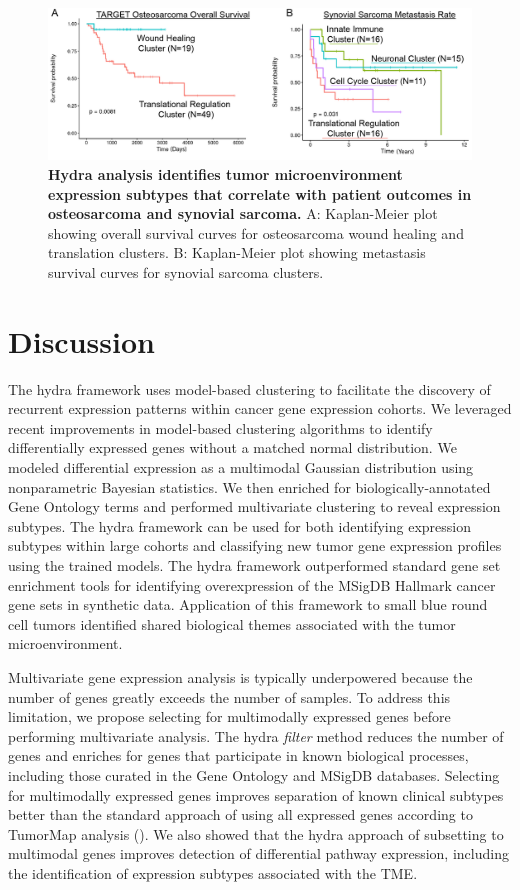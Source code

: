 \documentclass[10pt,letterpaper]{article}
\begin{document}
\begin{figure}[!h]
	\includegraphics[width=\textwidth]{img/PNG/osteosarcoma-synovial-survival-2x}
	\caption{{\bf Hydra analysis identifies tumor microenvironment expression subtypes that correlate with patient outcomes in osteosarcoma and synovial sarcoma.} A: Kaplan-Meier plot showing overall survival curves for osteosarcoma wound healing and translation clusters. B: Kaplan-Meier plot showing metastasis survival curves for synovial sarcoma clusters.}
	\label{surv}
\end{figure}

\section*{Discussion}
The hydra framework uses model-based clustering to facilitate the discovery of recurrent expression patterns within cancer gene expression cohorts. We leveraged recent improvements in model-based clustering algorithms to identify differentially expressed genes without a matched normal distribution. We modeled differential expression as a multimodal Gaussian distribution using nonparametric Bayesian statistics. We then enriched for biologically-annotated Gene Ontology terms and performed multivariate clustering to reveal expression subtypes. The hydra framework can be used for both identifying expression subtypes within large cohorts and classifying new tumor gene expression profiles using the trained models. The hydra framework outperformed standard gene set enrichment tools for identifying overexpression of the MSigDB Hallmark cancer gene sets in synthetic data. Application of this framework to small blue round cell tumors identified shared biological themes associated with the tumor microenvironment.

Multivariate gene expression analysis is typically underpowered because the number of genes greatly exceeds the number of samples. To address this limitation, we propose selecting for multimodally expressed genes before performing multivariate analysis. The hydra \textit{filter} method reduces the number of genes and enriches for genes that participate in known biological processes, including those curated in the Gene Ontology and MSigDB databases. Selecting for multimodally expressed genes improves separation of known clinical subtypes better than the standard approach of using all expressed genes according to TumorMap analysis (). We also showed that the hydra approach of subsetting to multimodal genes improves detection of differential pathway expression, including the identification of expression subtypes associated with the TME.
\end{document}
